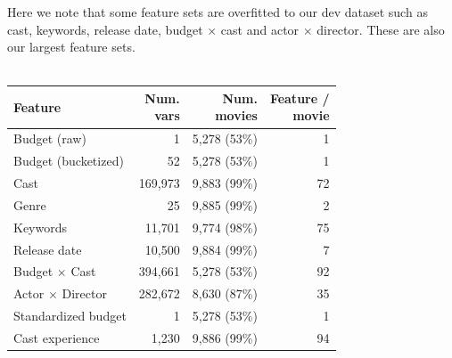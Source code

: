 \documentclass[journal]{IEEEtran}
\begin{document}
\par Here we note that some feature sets are overfitted to our dev dataset such as
cast, keywords, release date, budget $\times$ cast and actor $\times$ director.
These are also our largest feature sets.\\
\\
\begin{tabular}{|l| r r r|} %
\hline
Feature             & \shortstack[c]{Num.\\vars} & \shortstack[c]{Num.\\movies} & \shortstack[c]{Feature / \\ movie}  \\ [0.5ex] %
\hline
Budget (raw)        & 1 & 5,278 (53\%) & 1 \\ %
Budget (bucketized) & 52 & 5,278 (53\%) & 1 \\
Cast                & 169,973 & 9,883 (99\%) & 72 \\
Genre               & 25 & 9,885 (99\%) & 2 \\
Keywords            & 11,701 & 9,774 (98\%) & 75 \\
Release date        & 10,500 & 9,884 (99\%) & 7 \\
\hline
Budget $\times$ Cast & 394,661 & 5,278 (53\%) & 92 \\
Actor $\times$ Director & 282,672 & 8,630 (87\%) & 35 \\
\hline
Standardized budget & 1 & 5,278 (53\%) & 1 \\
Cast experience & 1,230 & 9,886 (99\%) & 94 \\
\hline %
\end{tabular}
\end{document}
